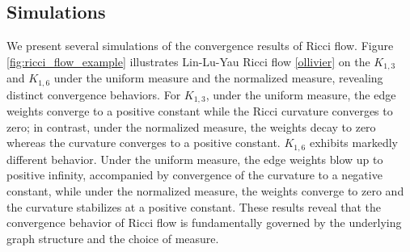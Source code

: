 \documentclass{article}
\begin{document}
\subsection{Simulations}
We present several simulations of the convergence results of Ricci flow.  Figure \ref{fig:ricci_flow_example} illustrates Lin-Lu-Yau Ricci flow \eqref{ollivier} on the $K_{1,3}$ and $K_{1,6}$ under the uniform measure and the normalized measure, revealing distinct convergence behaviors. For $K_{1,3}$, under the uniform measure, the edge weights converge to a positive constant while the Ricci curvature converges to zero; in contrast, under the normalized measure, the weights decay to zero whereas the curvature converges to a positive constant. $K_{1,6}$ exhibits markedly different behavior. Under the uniform measure, the edge weights blow up to positive infinity, accompanied by convergence of the curvature to a negative constant, while under the normalized measure, the weights converge to zero and the curvature stabilizes at a positive constant. These results reveal that the convergence behavior of Ricci flow is fundamentally governed by the underlying graph structure and the choice of measure.
\end{document}
